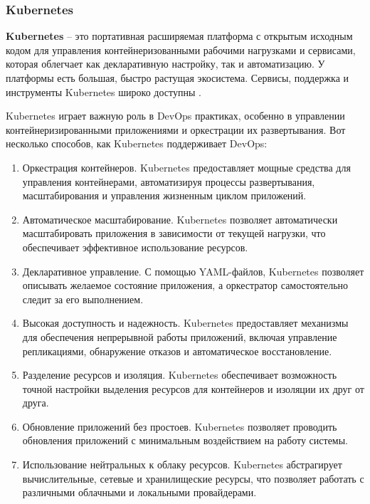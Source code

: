 \documentclass[referat]{SCWorks}
\begin{document}
\subsubsection{Kubernetes}

\textbf{Kubernetes} -- это портативная расширяемая платформа с открытым исходным кодом для управления контейнеризованными рабочими нагрузками и сервисами, которая облегчает как декларативную настройку, так и автоматизацию. У платформы есть большая, быстро растущая экосистема. Сервисы, поддержка и инструменты Kubernetes широко доступны \cite{Kubernetes}.

Kubernetes играет важную роль в DevOps практиках, особенно в управлении контейнеризированными приложениями и оркестрации их развертывания. Вот несколько способов, как Kubernetes поддерживает DevOps:

\begin{enumerate}
\item Оркестрация контейнеров. Kubernetes предоставляет мощные средства для управления контейнерами, автоматизируя процессы развертывания, масштабирования и управления жизненным циклом приложений.

\item Автоматическое масштабирование. Kubernetes позволяет автоматически масштабировать приложения в зависимости от текущей нагрузки, что обеспечивает эффективное использование ресурсов.

\item Декларативное управление. С помощью YAML-файлов, Kubernetes позволяет описывать желаемое состояние приложения, а оркестратор самостоятельно следит за его выполнением.

\item Высокая доступность и надежность. Kubernetes предоставляет механизмы для обеспечения непрерывной работы приложений, включая управление репликациями, обнаружение отказов и автоматическое восстановление.

\item Разделение ресурсов и изоляция. Kubernetes обеспечивает возможность точной настройки выделения ресурсов для контейнеров и изоляции их друг от друга.

\item Обновление приложений без простоев. Kubernetes позволяет проводить обновления приложений с минимальным воздействием на работу системы.

\item Использование нейтральных к облаку ресурсов. Kubernetes абстрагирует вычислительные, сетевые и хранилищеские ресурсы, что позволяет работать с различными облачными и локальными провайдерами.


\end{enumerate}
\end{document}

